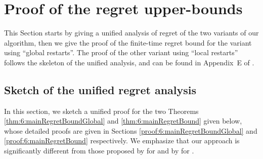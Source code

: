 \section{Proof of the regret upper-bounds}
\label{sec:6:proofRegret}

This Section starts by giving a unified analysis of regret of the two variants of our algorithm, then we give the proof of the finite-time regret bound for the variant using ``global restarts''.
The proof of the other variant using ``local restarts'' follows the skeleton of the unified analysis, and can be found in Appendix~E of \cite{Besson2019GLRT}.

\subsection{Sketch of the unified regret analysis}
\label{sub:6:proofSkeleton}

In this section, we sketch a unified proof for the two Theorems \ref{thm:6:mainRegretBoundGlobal} and \ref{thm:6:mainRegretBound} given below, whose detailed proofs are given in Sections \ref{proof:6:mainRegretBoundGlobal} and \ref{proof:6:mainRegretBound} respectively.
We emphasize that our approach is significantly different from those proposed by \cite{CaoZhenKvetonXie18} for \MUCB{} and by \cite{LiuLeeShroff17} for \CUSUMUCB.

